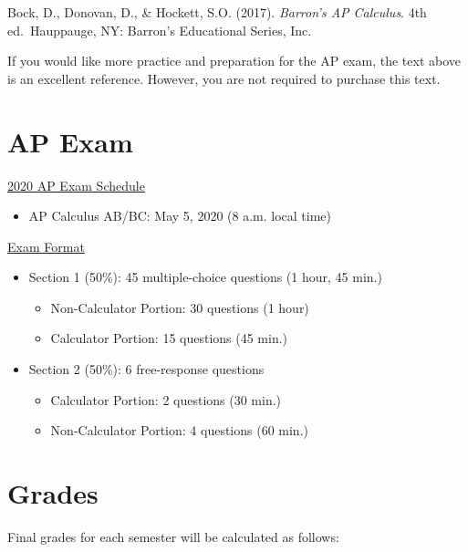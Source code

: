 \documentclass[12pt,fleqn]{article}
\providecommand{\tightlist}{%
  \setlength{\itemsep}{0pt}\setlength{\parskip}{0pt}}
\begin{document}
Bock, D., Donovan, D., \& Hockett, S.O. (2017). \emph{Barron's AP
Calculus}. 4th ed.~Hauppauge, NY: Barron's Educational Series,
Inc.

If you would like more practice and preparation for the AP exam, the text above is an excellent reference. However, you are not required to purchase this text.

\hypertarget{ap-exam}{%
\section{AP Exam}\label{ap-exam}}

\href{https://apcentral.collegeboard.org/courses/exam-dates-and-fees/exam-dates-2020}{2020 AP Exam Schedule}

\begin{itemize}
\tightlist
\item
  AP Calculus AB/BC: May 5, 2020 (8 a.m. local time)
\end{itemize}

\href{https://apcentral.collegeboard.org/courses/ap-calculus-ab/exam}{Exam Format}

\begin{itemize}
\tightlist
\item
  Section 1 (50\%): 45 multiple-choice questions (1 hour, 45 min.)

  \begin{itemize}
  \tightlist
  \item
    Non-Calculator Portion: 30 questions (1 hour)
  \item
    Calculator Portion: 15 questions (45 min.)
  \end{itemize}
\item
  Section 2 (50\%): 6 free-response questions

  \begin{itemize}
  \tightlist
  \item
    Calculator Portion: 2 questions (30 min.)
  \item
    Non-Calculator Portion: 4 questions (60 min.)
  \end{itemize}
\end{itemize}

\hypertarget{grades}{%
\section{Grades}\label{grades}}

Final grades for each semester will be calculated as follows:
\end{document}
